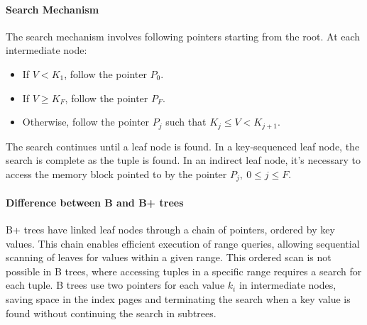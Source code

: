 \paragraph*{Search Mechanism}
The search mechanism involves following pointers starting from the root. 
At each intermediate node:
\begin{itemize}
  \item If $V < K_1$, follow the pointer $P_0$.
  \item If $V \geq K_F$, follow the pointer $P_F$.
  \item Otherwise, follow the pointer $P_j$ such that $K_j \leq V < K_{j + 1}$. 
\end{itemize}
The search continues until a leaf node is found. 
In a key-sequenced leaf node, the search is complete as the tuple is found. 
In an indirect leaf node, it's necessary to access the memory block pointed to by the pointer $P_j, \: 0 \leq j \leq F$.


\paragraph*{Difference between B and B+ trees}
B+ trees have linked leaf nodes through a chain of pointers, ordered by key values. 
This chain enables efficient execution of range queries, allowing sequential scanning of leaves for values within a given range. 
This ordered scan is not possible in B trees, where accessing tuples in a specific range requires a search for each tuple. 
B trees use two pointers for each value  $k_i$ in intermediate nodes, saving space in the index pages and terminating the search when a key value is found without continuing the search in subtrees.